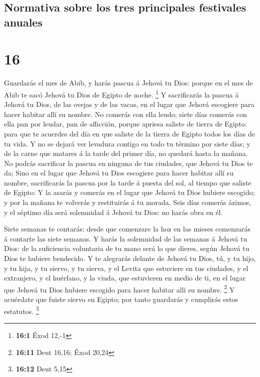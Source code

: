 \hypertarget{normativa-sobre-los-tres-principales-festivales-anuales}{%
\subsection{Normativa sobre los tres principales festivales
anuales}\label{normativa-sobre-los-tres-principales-festivales-anuales}}

\hypertarget{section-15}{%
\section{16}\label{section-15}}

 Guardarás el mes de Abib, y harás pascua á Jehová tu
Dios: porque en el mes de Abib te sacó Jehová tu Dios de Egipto de
noche. \footnote{\textbf{16:1} Éxod 12,-1}  Y sacrificarás
la pascua á Jehová tu Dios, de las ovejas y de las vacas, en el lugar
que Jehová escogiere para hacer habitar allí su nombre. 
No comerás con ella leudo; siete días comerás con ella pan por leudar,
pan de aflicción, porque apriesa saliste de tierra de Egipto: para que
te acuerdes del día en que saliste de la tierra de Egipto todos los días
de tu vida.  Y no se dejará ver levadura contigo en todo
tu término por siete días; y de la carne que matares á la tarde del
primer día, no quedará hasta la mañana.  No podrás
sacrificar la pascua en ninguna de tus ciudades, que Jehová tu Dios te
da;  Sino en el lugar que Jehová tu Dios escogiere para
hacer habitar allí su nombre, sacrificarás la pascua por la tarde á
puesta del sol, al tiempo que saliste de Egipto:  Y la
asarás y comerás en el lugar que Jehová tu Dios hubiere escogido; y por
la mañana te volverás y restituirás á tu morada.  Seis
días comerás ázimos, y el séptimo día será solemnidad á Jehová tu Dios:
no harás obra en él.

 Siete semanas te contarás: desde que comenzare la hoz en
las mieses comenzarás á contarte las siete semanas.  Y
harás la solemnidad de las semanas á Jehová tu Dios: de la suficiencia
voluntaria de tu mano será lo que dieres, según Jehová tu Dios te
hubiere bendecido.  Y te alegrarás delante de Jehová tu
Dios, tú, y tu hijo, y tu hija, y tu siervo, y tu sierva, y el Levita
que estuviere en tus ciudades, y el extranjero, y el huérfano, y la
viuda, que estuvieren en medio de ti, en el lugar que Jehová tu Dios
hubiere escogido para hacer habitar allí su nombre. \footnote{\textbf{16:11}
  Deut 16,16; Éxod 20,24}  Y acuérdate que fuiste siervo
en Egipto; por tanto guardarás y cumplirás estos estatutos. \footnote{\textbf{16:12}
  Deut 5,15}


